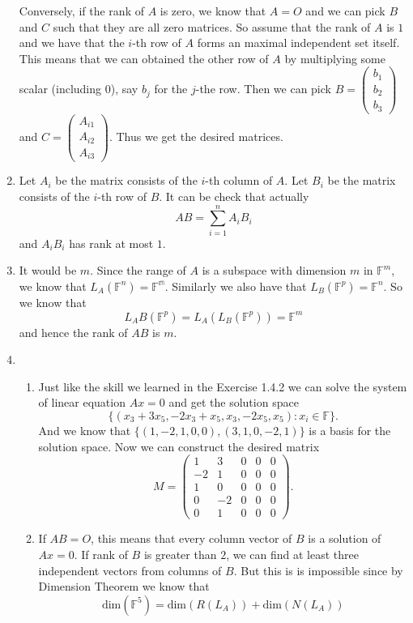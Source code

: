 \begin{enumerate}
Conversely, if the rank of $A$ is zero, we know that $A=O$ and we can pick $B$ and $C$ such that they are all zero matrices. So assume that the rank of $A$ is $1$ and we have that the $i$-th row of $A$ forms an maximal independent set itself. This means that we can obtained the other row of $A$ by multiplying some scalar (including $0$), say $b_j$ for the $j$-the row. Then we can pick $B=\begin{pmatrix}b_1\\b_2\\b_3\end{pmatrix}$ and $C=\begin{pmatrix}A_{i1}\\A_{i2}\\A_{i3}\end{pmatrix}$. Thus we get the desired matrices.
\item Let $A_i$ be the matrix consists of the $i$-th column of $A$. Let $B_i$ be the matrix consists of the $i$-th row of $B$. It can be check that actually 
\[AB=\sum_{i=1}^n{A_iB_i}\]
and $A_iB_i$ has rank at most $1$.
\item It would be $m$. Since the range of $A$ is a subspace with dimension $m$ in $\mathbb{F}^m$, we know that $L_A(\mathbb{F}^n)=\mathbb{F^m}$. Similarly we also have that $L_B(\mathbb{F}^p)=\mathbb{F}^n$. So we know that 
\[L_AB(\mathbb{F}^p)=L_A(L_B(\mathbb{F}^p))=\mathbb{F}^m\]
and hence the rank of $AB$ is $m$.
\item \begin{enumerate}
\item Just like the skill we learned in the Exercise 1.4.2 we can solve the system of linear equation $Ax=0$ and get the solution space 
\[\{(x_3+3x_5,-2x_3+x_5,x_3,-2x_5,x_5):x_i\in\mathbb{F}\}.\]
And we know that $\{(1,-2,1,0,0),(3,1,0,-2,1)\}$ is a basis for the solution space. Now we can construct the desired matrix 
\[M=\begin{pmatrix}1&3&0&0&0\\-2&1&0&0&0\\1&0&0&0&0\\0&-2&0&0&0\\0&1&0&0&0\end{pmatrix}.\]
\item If $AB=O$, this means that every column vector of $B$ is a solution of $Ax=0$. If rank of $B$ is greater than $2$, we can find at least three independent vectors from columns of $B$. But this is is impossible since by Dimension Theorem we know that 
\[\mathrm{dim}(\mathbb{F}^5)=\mathrm{dim}(R(L_A))+\mathrm{dim}(N(L_A))\]

\end{enumerate}
\end{enumerate}
